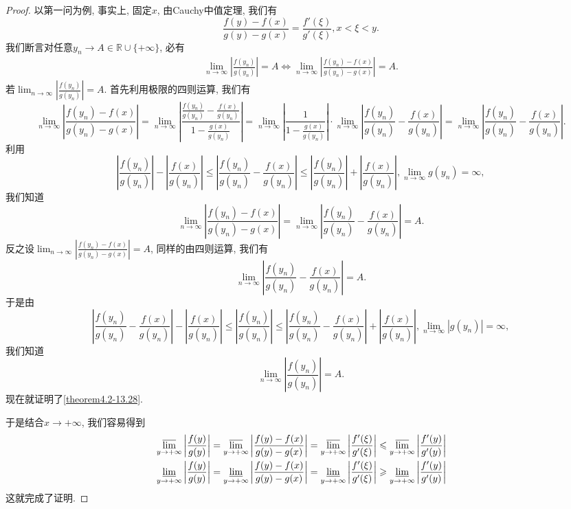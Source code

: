 \documentclass[../../main.tex]{subfiles}%
\begin{document}
\begin{proof}

以第一问为例, 事实上, 固定\(x\), 由Cauchy中值定理, 我们有
\[
\frac{f(y)-f(x)}{g(y)-g(x)}=\frac{f'(\xi)}{g'(\xi)},x < \xi < y.
\]
我们断言对任意\(y_n\to A \in \mathbb{R} \cup \{+\infty\}\), 必有
\begin{align}\label{theorem4.2-13.28}
\lim_{n\rightarrow\infty}\left|\frac{f(y_n)}{g(y_n)}\right| = A \Leftrightarrow \lim_{n\rightarrow\infty}\left|\frac{f(y_n)-f(x)}{g(y_n)-g(x)}\right| = A.
\end{align}
若\(\lim_{n\rightarrow\infty}\left|\frac{f(y_n)}{g(y_n)}\right| = A\). 首先利用极限的四则运算, 我们有
\[
\lim_{n\rightarrow\infty}\left|\frac{f(y_n)-f(x)}{g(y_n)-g(x)}\right|=\lim_{n\rightarrow\infty}\left|\frac{\frac{f(y_n)}{g(y_n)}-\frac{f(x)}{g(y_n)}}{1 - \frac{g(x)}{g(y_n)}}\right|=\lim_{n\rightarrow\infty}\left|\frac{1}{1 - \frac{g(x)}{g(y_n)}}\right|\cdot\lim_{n\rightarrow\infty}\left|\frac{f(y_n)}{g(y_n)}-\frac{f(x)}{g(y_n)}\right|=\lim_{n\rightarrow\infty}\left|\frac{f(y_n)}{g(y_n)}-\frac{f(x)}{g(y_n)}\right|.
\]
利用
\[
\left|\frac{f(y_n)}{g(y_n)}\right|-\left|\frac{f(x)}{g(y_n)}\right|\leqslant\left|\frac{f(y_n)}{g(y_n)}-\frac{f(x)}{g(y_n)}\right|\leqslant\left|\frac{f(y_n)}{g(y_n)}\right|+\left|\frac{f(x)}{g(y_n)}\right|, \lim_{n\rightarrow\infty} g(y_n) = \infty,
\]
我们知道
\[
\lim_{n\rightarrow\infty}\left|\frac{f(y_n)-f(x)}{g(y_n)-g(x)}\right|=\lim_{n\rightarrow\infty}\left|\frac{f(y_n)}{g(y_n)}-\frac{f(x)}{g(y_n)}\right| = A.
\]
反之设\(\lim_{n\rightarrow\infty}\left|\frac{f(y_n)-f(x)}{g(y_n)-g(x)}\right| = A\), 同样的由四则运算, 我们有
\[
\lim_{n\rightarrow\infty}\left|\frac{f(y_n)}{g(y_n)}-\frac{f(x)}{g(y_n)}\right| = A.
\]
于是由
\[
\left|\frac{f(y_n)}{g(y_n)}-\frac{f(x)}{g(y_n)}\right|-\left|\frac{f(x)}{g(y_n)}\right|\leqslant\left|\frac{f(y_n)}{g(y_n)}\right|\leqslant\left|\frac{f(y_n)}{g(y_n)}-\frac{f(x)}{g(y_n)}\right|+\left|\frac{f(x)}{g(y_n)}\right|, \lim_{n\rightarrow\infty}|g(y_n)| = \infty,
\]
我们知道
\[
\lim_{n\rightarrow\infty}\left|\frac{f(y_n)}{g(y_n)}\right| = A.
\]
现在就证明了\eqref{theorem4.2-13.28}.

于是结合\(x \to +\infty\), 我们容易得到
\begin{align*}
&\varlimsup_{y\rightarrow+\infty}\left|\frac{f(y)}{g(y)}\right|=\varlimsup_{y\rightarrow+\infty}\left|\frac{f(y)-f(x)}{g(y)-g(x)}\right|=\varlimsup_{y\rightarrow+\infty}\left|\frac{f'(\xi)}{g'(\xi)}\right|\leqslant\varlimsup_{y\rightarrow+\infty}\left|\frac{f'(y)}{g'(y)}\right|\\
&\varliminf_{y\rightarrow+\infty}\left|\frac{f(y)}{g(y)}\right|=\varliminf_{y\rightarrow+\infty}\left|\frac{f(y)-f(x)}{g(y)-g(x)}\right|=\varliminf_{y\rightarrow+\infty}\left|\frac{f'(\xi)}{g'(\xi)}\right|\geqslant\varliminf_{y\rightarrow+\infty}\left|\frac{f'(y)}{g'(y)}\right|
\end{align*}
这就完成了证明.

\end{proof}
\end{document}
